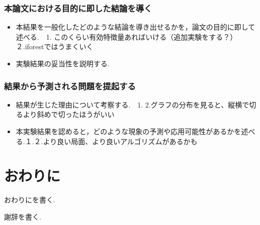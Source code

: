 \documentclass{css}
\begin{document}
\subsubsection{本論文における目的に即した結論を導く}
\begin{itemize}
    \item 本結果を一般化したどのような結論を導き出せるかを，論文の目的に即して述べる.　1. このくらい有効特徴量あればいける（追加実験をする？）　２.iforestではうまくいく
    \item 実験結果の妥当性を説明する.
\end{itemize}

\subsubsection{結果から予測される問題を提起する}
\begin{itemize}
    \item 結果が生じた理由について考察する.　1. 2.グラフの分布を見ると、縦横で切るより斜めで切ったほうがいい
    \item 本実験結果を認めると，どのような現象の予測や応用可能性があるかを述べる.１.２.より良い局面、より良いアルゴリズムがあるかも
\end{itemize}

\section{おわりに}
おわりにを書く.

\begin{acknowledgment}
謝辞を書く.
\end{acknowledgment}

\begin{thebibliography}{10}

\end{thebibliography}
\end{document}
